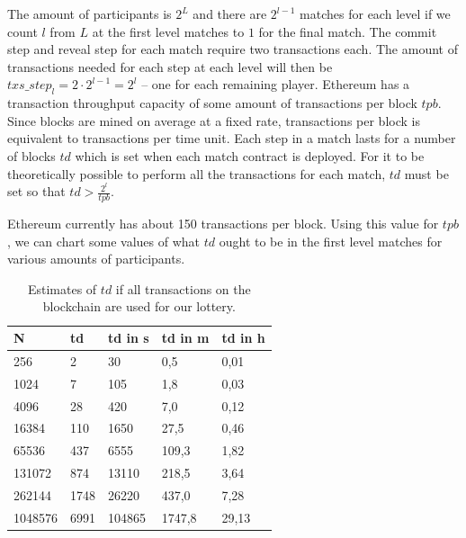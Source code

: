 The amount of participants is $2^L$ and there are $2^{l-1}$ matches for each level if we count $l$ from $L$ at the first level matches to $1$ for the final match. The commit step and reveal step for each match require two transactions each. The amount of transactions needed for each step at each level will then be $txs\_step_{l}=2 \cdot 2^{l-1}=2^l$ – one for each remaining player. Ethereum has a transaction throughput capacity of some amount of transactions per block $tpb$. Since blocks are mined on average at a fixed rate, transactions per block is equivalent to transactions per time unit.
Each step in a match lasts for a number of blocks $td$ which is set when each match contract is deployed. For it to be theoretically possible to perform all the transactions for each match, $td$ must be set so that $td > \frac{2^{l}}{tpb}$.

Ethereum currently has about 150 transactions per block. Using this value for $tpb$, we can chart some values of what $td$ ought to be in the first level matches for various amounts of participants.

\begin{table}[h]
\centering
\caption{Estimates of $td$ if all transactions on the blockchain are used for our lottery.}
\label{tab:td-100percent-transactions}
\begin{tabular}{|l|l|l|l|l|}
\hline

N & td & td in s & td in m & td in h \\ \hline
256 & 2 & 30 & 0,5 & 0,01 \\ \hline
1024 & 7 & 105 & 1,8 & 0,03 \\ \hline
4096 & 28 & 420 & 7,0 & 0,12 \\ \hline
16384 & 110 & 1650 & 27,5 & 0,46 \\ \hline
65536 & 437 & 6555 & 109,3 & 1,82 \\ \hline
131072 & 874 & 13110 & 218,5 & 3,64 \\ \hline
262144 & 1748 & 26220 & 437,0 & 7,28 \\ \hline
1048576 & 6991 & 104865 & 1747,8 & 29,13 \\ \hline

\end{tabular}
\end{table}

